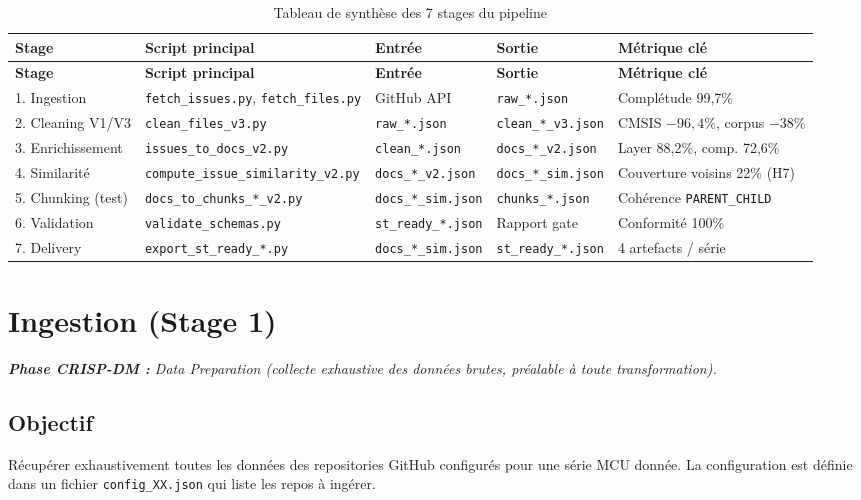 \documentclass[12pt,a4paper]{report}
\begin{document}
\begin{longtable}{p{2.3cm}p{3.6cm}p{2.7cm}p{2.7cm}p{2.6cm}}
\caption{Tableau de synthèse des 7 stages du pipeline}
\label{tab:master_stages}\\
\toprule
\textbf{Stage} & \textbf{Script principal} & \textbf{Entrée} & \textbf{Sortie} & \textbf{Métrique clé} \\
\midrule
\endfirsthead
\toprule
\textbf{Stage} & \textbf{Script principal} & \textbf{Entrée} & \textbf{Sortie} & \textbf{Métrique clé} \\
\midrule
\endhead
1. Ingestion & \texttt{fetch\_issues.py}, \texttt{fetch\_files.py} & GitHub API & \texttt{raw\_*.json} & Complétude 99,7\% \\
2. Cleaning V1/V3 & \texttt{clean\_files\_v3.py} & \texttt{raw\_*.json} & \texttt{clean\_*\_v3.json} & CMSIS $-96,4\%$, corpus $-38\%$ \\
3. Enrichissement & \texttt{issues\_to\_docs\_v2.py} & \texttt{clean\_*.json} & \texttt{docs\_*\_v2.json} & Layer 88,2\%, comp. 72,6\% \\
4. Similarité & \texttt{compute\_issue\_similarity\_v2.py} & \texttt{docs\_*\_v2.json} & \texttt{docs\_*\_sim.json} & Couverture voisins 22\% (H7) \\
5. Chunking (test) & \texttt{docs\_to\_chunks\_*\_v2.py} & \texttt{docs\_*\_sim.json} & \texttt{chunks\_*.json} & Cohérence \texttt{PARENT\_CHILD} \\
6. Validation & \texttt{validate\_schemas.py} & \texttt{st\_ready\_*.json} & Rapport gate & Conformité 100\% \\
7. Delivery & \texttt{export\_st\_ready\_*.py} & \texttt{docs\_*\_sim.json} & \texttt{st\_ready\_*.json} & 4 artefacts / série \\
\bottomrule
\end{longtable}

\section{Ingestion (Stage 1)}

\textit{\small\textbf{\textcolor{stblue}{Phase CRISP-DM :}} Data Preparation (collecte exhaustive des données brutes, préalable à toute transformation).}\par\smallskip

\subsection{Objectif}
Récupérer exhaustivement toutes les données des repositories GitHub configurés pour une série MCU donnée. La configuration est définie dans un fichier \texttt{config\_XX.json} qui liste les repos à ingérer.
\end{document}
